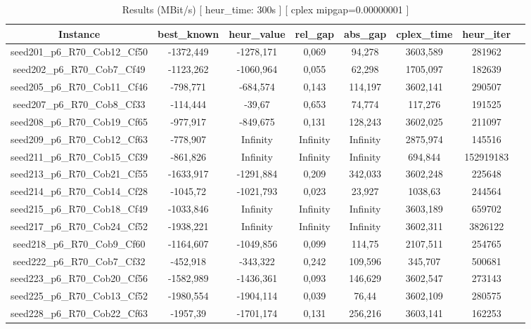 \documentclass[a4paper]{article}
\begin{document}
\begin{center}
\begin{longtable}{cccccccc}
\caption{Results (MBit/s) [ heur\_time: 300s ]  [ cplex mipgap=0.00000001 ]}
\tabularnewline
\hline
Instance & best\_known & heur\_value & rel\_gap & abs\_gap & cplex\_time & heur\_iter\\
\hline
seed201\_p6\_R70\_Cob12\_Cf50 & -1372,449 & -1278,171 & 0,069 & 94,278 & 3603,589 & 281962\\
\hline
seed202\_p6\_R70\_Cob7\_Cf49 & -1123,262 & -1060,964 & 0,055 & 62,298 & 1705,097 & 182639\\
\hline
seed205\_p6\_R70\_Cob11\_Cf46 & -798,771 & -684,574 & 0,143 & 114,197 & 3602,141 & 290507\\
\hline
seed207\_p6\_R70\_Cob8\_Cf33 & -114,444 & -39,67 & 0,653 & 74,774 & 117,276 & 191525\\
\hline
seed208\_p6\_R70\_Cob19\_Cf65 & -977,917 & -849,675 & 0,131 & 128,243 & 3602,025 & 211097\\
\hline
seed209\_p6\_R70\_Cob12\_Cf63 & -778,907 & Infinity & Infinity & Infinity & 2875,974 & 145516\\
\hline
seed211\_p6\_R70\_Cob15\_Cf39 & -861,826 & Infinity & Infinity & Infinity & 694,844 & 152919183\\
\hline
seed213\_p6\_R70\_Cob21\_Cf55 & -1633,917 & -1291,884 & 0,209 & 342,033 & 3602,248 & 225648\\
\hline
seed214\_p6\_R70\_Cob14\_Cf28 & -1045,72 & -1021,793 & 0,023 & 23,927 & 1038,63 & 244564\\
\hline
seed215\_p6\_R70\_Cob18\_Cf49 & -1033,846 & Infinity & Infinity & Infinity & 3603,189 & 659702\\
\hline
seed217\_p6\_R70\_Cob24\_Cf52 & -1938,221 & Infinity & Infinity & Infinity & 3602,311 & 3826122\\
\hline
seed218\_p6\_R70\_Cob9\_Cf60 & -1164,607 & -1049,856 & 0,099 & 114,75 & 2107,511 & 254765\\
\hline
seed222\_p6\_R70\_Cob7\_Cf32 & -452,918 & -343,322 & 0,242 & 109,596 & 345,707 & 500681\\
\hline
seed223\_p6\_R70\_Cob20\_Cf56 & -1582,989 & -1436,361 & 0,093 & 146,629 & 3602,547 & 273143\\
\hline
seed225\_p6\_R70\_Cob13\_Cf52 & -1980,554 & -1904,114 & 0,039 & 76,44 & 3602,109 & 280575\\
\hline
seed228\_p6\_R70\_Cob22\_Cf63 & -1957,39 & -1701,174 & 0,131 & 256,216 & 3603,141 & 162253\\
\hline

\end{longtable}
\end{center}
\end{document}
